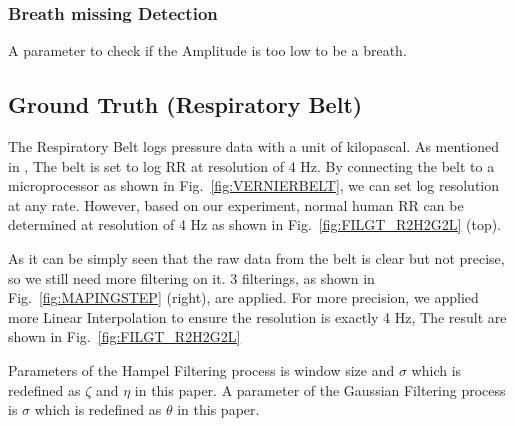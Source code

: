\documentclass[10pt,letterpaper]{article}
\begin{document}
	

		\subsubsection*{Breath missing Detection}
		
		A parameter to check if the Amplitude is too low to be a breath.

		\subsection*{Ground Truth (Respiratory Belt)}
	
	The Respiratory Belt logs pressure data with a unit of kilopascal. As mentioned in , The belt is set to log RR at resolution of 4 Hz. By connecting the belt to a microprocessor as shown in Fig.~\ref{fig:VERNIERBELT}, we can set log resolution at any rate. However, based on our experiment, normal human RR can be determined at resolution of 4 Hz as shown in Fig.~\ref{fig:FILGT_R2H2G2L} (top).
	
	As it can be simply seen that the raw data from the belt is clear but not precise, so we still need more filtering on it. 3 filterings, as shown in Fig.~\ref{fig:MAPINGSTEP} (right), are applied. For more precision, we applied more Linear Interpolation to ensure the resolution is exactly 4 Hz, The result are shown in Fig.~\ref{fig:FILGT_R2H2G2L}
	
	Parameters of the Hampel Filtering process is window size and $\sigma$ which is redefined as $\zeta$ and $\eta$ in this paper. A parameter of the Gaussian Filtering process is $\sigma$ which is redefined as $\theta$ in this paper.
	
\end{document}
